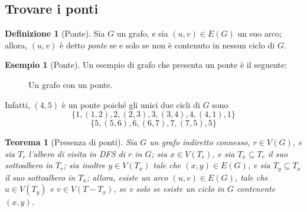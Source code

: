 \documentclass[14pt]{extreport}
\newtheorem{theorem}{Teorema}[subsection]
\theoremstyle{definition}
\newtheorem{definition}{Definizione}[subsection]
\theoremstyle{definition}
\newtheorem{example}{Esempio}[subsection]
\begin{document}
\subsection{Trovare i ponti}

\begin{definition}[Ponte]
    Sia $G$ un grafo, e sia $(u, v) \in E(G)$ un suo arco; allora, $(u, v)$ è detto \textit{ponte} se e solo se non è contenuto in nessun ciclo di $G$.
\end{definition}

\begin{example}[Ponte]
    Un esempio di grafo che presenta un ponte è il seguente:

    \begin{figure}[H]
        \centering
        \caption{Un grafo con un ponte.}
    \end{figure}

    Infatti, $(4, 5)$ è un ponte poiché gli unici due cicli di $G$ sono $$\{1, (1, 2), 2, (2, 3), 3, (3, 4), 4, (4, 1), 1\}$$ $$\{5, (5, 6), 6, (6, 7), 7, (7, 5), 5\}$$
\end{example}

\begin{theorem}[Presenza di ponti]
    \label{teorema dei ponti}
    Sia $G$ un grafo indiretto connesso, $r \in V(G)$, e sia $T_r$ l'albero di visita in DFS di $r$ in $G$; sia $x \in V(T_r)$, e sia $T_x \subseteq T_r$ il suo sottoalbero in $T_r$; sia inoltre $y \in V(T_x)$ tale che $(x, y) \in E(G)$, e sia $T_y \subseteq T_x$ il suo sottoalbero in $T_x$; allora, esiste un arco $(u, v) \in E(G)$, tale che $u \in V(T_y)$ e $v \in V(T - T_x)$, se e solo se esiste un ciclo in $G$ contenente $(x, y)$.
\end{theorem}
\end{document}
